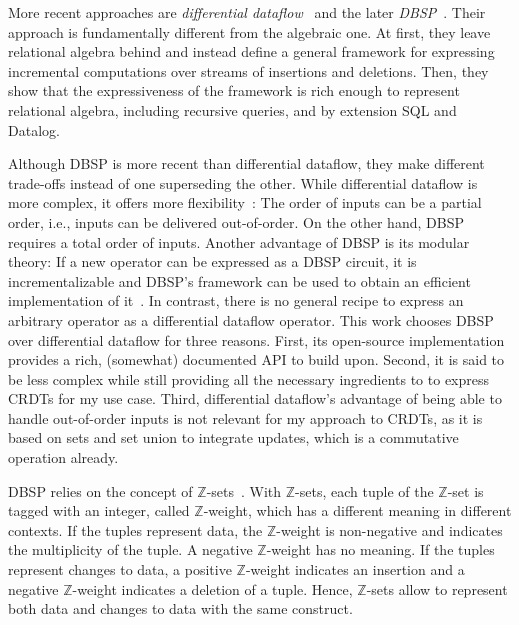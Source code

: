 More recent approaches are \emph{differential dataflow}~\cite{mcsherry2013differential}
and the later \emph{DBSP}~\cite{budiu2022dbsp, budiu2024dbsp, budiu2025dbsp}.
Their approach is fundamentally different from the algebraic one.
At first, they leave relational algebra behind and instead define a general
framework for expressing incremental computations over streams of insertions
and deletions.
Then, they show that the expressiveness of the framework is rich enough to
represent relational algebra, including recursive queries, and by extension
SQL and Datalog.

Although DBSP is more recent than differential dataflow,
they make different trade-offs instead of one superseding the other.
While differential dataflow is more complex, it offers more
flexibility~\cite{budiu2025dbsp}:
The order of inputs can be a partial order, i.e., inputs can be delivered
out-of-order.
On the other hand, DBSP requires a total order of inputs.
Another advantage of DBSP is its modular theory:
If a new operator can be expressed as a DBSP circuit, it is incrementalizable
and DBSP's framework can be used to obtain an efficient implementation
of it~\cite{budiu2025dbsp}.
In contrast, there is no general recipe to express an arbitrary operator
as a differential dataflow operator.
This work chooses DBSP over differential dataflow for three reasons.
First, its open-source implementation~\cite{feldera} provides a rich,
(somewhat) documented \ac{API}\footnotemark{} to build upon.
Second, it is said to be less complex while still providing all the necessary
ingredients to to express \acp{CRDT} for my use case.
Third, differential dataflow's advantage of being able to handle out-of-order
inputs is not relevant for my approach to \acp{CRDT}, as it is based on sets and
set union to integrate updates, which is a commutative operation already.


\newcommand{\zset}{\(\mathbb{Z}\)-set}
\newcommand{\zsets}{\(\mathbb{Z}\)-sets}
\newcommand{\zweight}{\(\mathbb{Z}\)-weight}

DBSP relies on the concept of \zsets{}~\cite{green2007provenance}\footnotemark{}.
With \zsets{}, each tuple of the \zset{} is tagged with an integer,
called \zweight{}, which has a different meaning in different contexts.
If the tuples represent data, the \zweight{} is non-negative and indicates
the multiplicity of the tuple.
A negative \zweight{} has no meaning.
If the tuples represent changes to data, a positive \zweight{} indicates
an insertion and a negative \zweight{} indicates a deletion of a tuple.
Hence, \zsets{} allow to represent both data and changes to data with the
same construct.

